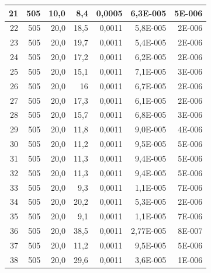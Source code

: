 \documentclass[12pt]{scrartcl}
\begin{document}
\begin{table}[H]
\begin{center}
\begin{tabular}{|r|r|r|r|r|r|r|}
21 & 505 & 10,0 & 8,4 & 0,0005  & 6,3E-005 & 5E-006 \\ \hline
22 & 505 & 20,0 & 18,5 & 0,0011  & 5,8E-005 & 2E-006 \\ \hline
23 & 505 & 20,0 & 19,7 & 0,0011  & 5,4E-005 & 2E-006 \\ \hline
24 & 505 & 20,0 & 17,2 & 0,0011  & 6,2E-005 & 2E-006 \\ \hline
25 & 505 & 20,0 & 15,1 & 0,0011  & 7,1E-005 & 3E-006 \\ \hline
26 & 505 & 20,0 & 16 & 0,0011  & 6,7E-005 & 2E-006 \\ \hline
27 & 505 & 20,0 & 17,3 & 0,0011  & 6,1E-005 & 2E-006 \\ \hline
28  & 505 & 20,0 & 15,7 & 0,0011  & 6,8E-005 & 3E-006 \\ \hline
29 & 505 & 20,0 & 11,8 & 0,0011  & 9,0E-005 & 4E-006 \\ \hline
30 & 505 & 20,0 & 11,2 & 0,0011  & 9,5E-005 & 5E-006 \\ \hline
31 & 505 & 20,0 & 11,3 & 0,0011  & 9,4E-005 & 5E-006 \\ \hline
32 & 505 & 20,0 & 11,3 & 0,0011  & 9,4E-005 & 5E-006 \\ \hline
33 & 505 & 20,0 & 9,3 & 0,0011  & 1,1E-005 & 7E-006 \\ \hline
34 & 505 & 20,0 & 20,2 & 0,0011  & 5,3E-005 & 2E-006 \\ \hline
35 & 505 & 20,0 & 9,1 & 0,0011  & 1,1E-005 & 7E-006 \\ \hline
36 & 505 & 20,0 & 38,5 & 0,0011  & 2,77E-005 & 8E-007 \\ \hline
37 & 505 & 20,0 & 11,2 & 0,0011  & 9,5E-005 & 5E-006 \\ \hline
38 & 505 & 20,0 & 29,6 & 0,0011  & 3,6E-005 & 1E-006 \\ \hline
\end{tabular}
\end{center}
\label{tab:messwerte_1}
\end{table}
\end{document}

